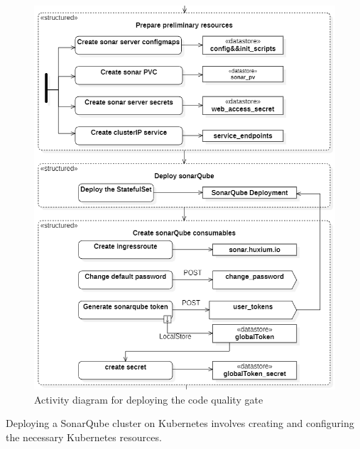 
\begin{figure}[H]\centering
\includegraphics[width=1.0\textwidth,angle=00]{assets/f41.png}
\caption{Activity diagram for deploying the code quality gate}
\label{fig:Activity diagram for deploying the code quality gate}
\end{figure}


Deploying a SonarQube cluster on Kubernetes involves creating and configuring the necessary Kubernetes resources. 

